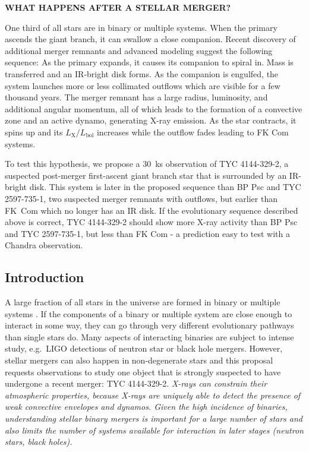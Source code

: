 \documentclass[letterpaper,11pt]{article}
\begin{document}
\pagestyle{plain}


 

\begin{center} 
\bfseries\uppercase{%
What happens after a stellar merger?
}
\end{center}

One third of all stars are in binary or multiple systems. When the primary ascends the giant branch, it can swallow a close companion. Recent discovery of additional merger remnants and advanced modeling suggest the following sequence: As the primary expands, it causes its companion to spiral in. Mass is transferred and an IR-bright disk forms. As the companion is engulfed, the system launches more or less collimated outflows which are visible for a few thousand years. The merger remnant has a large radius, luminosity, and additional angular momentum, all of which leads to the formation of a convective zone and an active dynamo, generating X-ray emission. As the star contracts, it spins up and its $L_\mathrm{X}/L_\mathrm{bol}$ increases while the outflow fades leading to FK Com systems. 

To test this hypothesis, we propose a 30~ks observation of TYC 4144-329-2, a suspected post-merger first-ascent giant branch star that is surrounded by an IR-bright disk. This system is later in the proposed sequence than BP Psc and  TYC 2597-735-1, two suspected merger remnants with outflows, but earlier than FK~Com which no longer has an IR disk. If the evolutionary sequence described above is correct, TYC 4144-329-2 should show more X-ray activity than BP Psc and  TYC 2597-735-1, but less than FK Com - a prediction easy to test with a Chandra observation.


\subsection*{Introduction}
A large fraction of all stars in the universe are formed in binary or multiple systems \cite{Raghavan+2010}. If the components of a binary or multiple system are close enough to interact in some way, they can go through very different evolutionary pathways than single stars do. Many aspects of interacting binaries are subject to intense study, e.g.\ LIGO detections of neutron star or black hole mergers. However, stellar mergers can also happen in non-degenerate stars and this proposal requests observations to study one object that is strongly suspected to have undergone a recent merger: TYC 4144-329-2. \textit{X-rays can constrain their atmospheric properties, because X-rays are uniquely able to detect the presence of weak convective envelopes and dynamos. Given the high incidence of binaries, understanding stellar binary mergers is important for a large number of stars and also limits the number of systems available for interaction in later stages (neutron stars, black holes).}
\end{document}
